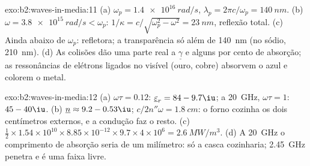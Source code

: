\begin{solution}{exo:b2:waves-in-media:11}
(a) $\omega_p = \qty{1.4e16}{rad/s}$, $\lambda_p = 2\pi c/\omega_p = \qty{140}{nm}$. (b) $\omega = \qty{3.8e15}{rad/s}
< \omega_p$: $1/\kappa = c/\sqrt{\omega_p^2 - \omega^2} = \qty{23}{nm}$, reflexão total. (c)
Ainda abaixo de $\omega_p$: refletora; a transparência só além de \qty{140}{nm} (no
sódio, \qty{210}{nm}). (d) As colisões dão uma parte real a $\underline\gamma$ e
alguns por cento de absorção; as ressonâncias de elétrons ligados no visível
(ouro, cobre) absorvem o azul e colorem o metal.
\end{solution}

\begin{solution}{exo:b2:waves-in-media:12}
(a) $\omega\tau = 0.12$: $\underline\varepsilon_r = 84 - 9.7\iu$; a \qty{20}{GHz}, $\omega\tau = 1$:
$45 - 40\iu$. (b) $\underline n \approx 9.2 - 0.53\iu$; $c/2n''\omega = \qty{1.8}{cm}$: o forno
cozinha os dois centímetros externos, e a condução faz o resto. (c) $\tfrac12 \times
1.54 \times 10^{10} \times 8.85 \times 10^{-12} \times 9.7 \times 4 \times 10^6 = \qty{2.6}{MW/m^3}$. (d) A
\qty{20}{GHz} o comprimento de absorção seria de um milímetro: só a casca
cozinharia; \qty{2.45}{GHz} penetra e é uma faixa livre.
\end{solution}

